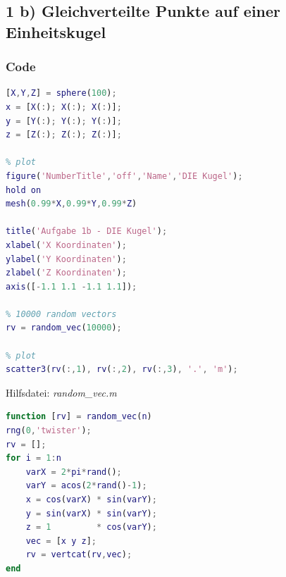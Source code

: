 \documentclass[12pt]{article}
\begin{document}
\subsection{1 b) Gleichverteilte Punkte auf einer Einheitskugel}
\subsubsection{Code}
\begin{lstlisting}[language=Matlab]
% create a sphere
[X,Y,Z] = sphere(100);
x = [X(:); X(:); X(:)];
y = [Y(:); Y(:); Y(:)];
z = [Z(:); Z(:); Z(:)];

% plot
figure('NumberTitle','off','Name','DIE Kugel');
hold on
mesh(0.99*X,0.99*Y,0.99*Z)

title('Aufgabe 1b - DIE Kugel');
xlabel('X Koordinaten');
ylabel('Y Koordinaten');
zlabel('Z Koordinaten');
axis([-1.1 1.1 -1.1 1.1]);

% 10000 random vectors
rv = random_vec(10000);

% plot
scatter3(rv(:,1), rv(:,2), rv(:,3), '.', 'm');
\end{lstlisting}
\newpage
Hilfsdatei: \textit{random\_vec.m}
\begin{lstlisting}[language=Matlab]
function [rv] = random_vec(n)
rng(0,'twister');
rv = [];
for i = 1:n
    varX = 2*pi*rand();
    varY = acos(2*rand()-1);
    x = cos(varX) * sin(varY);
    y = sin(varX) * sin(varY);
    z = 1         * cos(varY);
    vec = [x y z];
    rv = vertcat(rv,vec);
end
\end{lstlisting}
\end{document}
